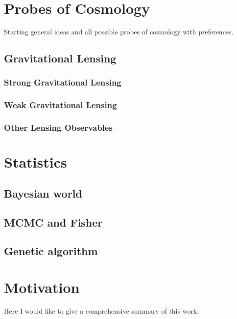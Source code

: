\clearpage
\section{Probes of Cosmology}

Starting general ideas and all possible probes of cosmology with preferences.


\subsection{Gravitational Lensing}
\subsubsection{Strong Gravitational Lensing}
\subsubsection{Weak Gravitational Lensing}
\subsubsection{Other Lensing Observables}

\clearpage
\section{Statistics}
\subsection{Bayesian world}
\subsection{MCMC and Fisher}
\subsection{Genetic algorithm}

\clearpage
\section{Motivation}

Here I would like to give a comprehensive summary of this work.

